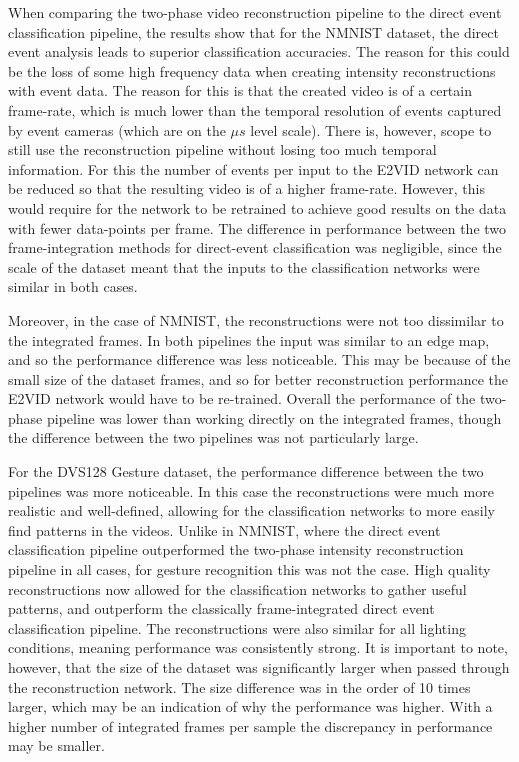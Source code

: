 When comparing the two-phase video reconstruction pipeline to the direct event classification pipeline, the results show that for the NMNIST dataset, the direct event analysis leads to superior classification accuracies. The reason for this could be the loss of some high frequency data when creating intensity reconstructions with event data. The reason for this is that the created video is of a certain frame-rate, which is much lower than the temporal resolution of events captured by event cameras (which are on the $ \mu s $ level scale). There is, however, scope to still use the reconstruction pipeline without losing too much temporal information. For this the number of events per input to the E2VID network can be reduced so that the resulting video is of a higher frame-rate. However, this would require for the network to be retrained to achieve good results on the data with fewer data-points per frame. The difference in performance between the two frame-integration methods for direct-event classification was negligible, since the scale of the dataset meant that the inputs to the classification networks were similar in both cases.

Moreover, in the case of NMNIST, the reconstructions were not too dissimilar to the integrated frames. In both pipelines the input was similar to an edge map, and so the performance difference was less noticeable. This may be because of the small size of the dataset frames, and so for better reconstruction performance the E2VID network would have to be re-trained. Overall the performance of the two-phase pipeline was lower than working directly on the integrated frames, though the difference between the two pipelines was not particularly large.

For the DVS128 Gesture dataset, the performance difference between the two pipelines was more noticeable. In this case the reconstructions were much more realistic and well-defined, allowing for the classification networks to more easily find patterns in the videos. Unlike in NMNIST, where the direct event classification pipeline outperformed the two-phase intensity reconstruction pipeline in all cases, for gesture recognition this was not the case. High quality reconstructions now allowed for the classification networks to gather useful patterns, and outperform the classically frame-integrated direct event classification pipeline. The reconstructions were also similar for all lighting conditions, meaning performance was consistently strong. It is important to note, however, that the size of the dataset was significantly larger when passed through the reconstruction network. The size difference was in the order of 10 times larger, which may be an indication of why the performance was higher. With a higher number of integrated frames per sample the discrepancy in performance may be smaller.

